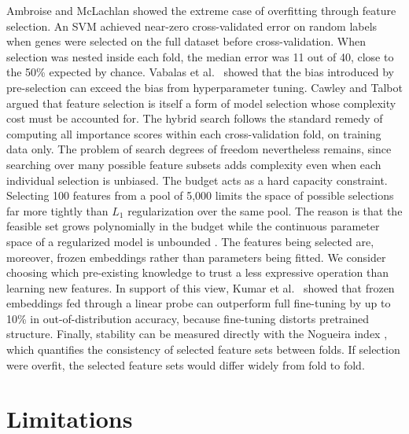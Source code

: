 Ambroise and McLachlan \citep{Ambroise2002} showed the extreme case of overfitting through feature selection. An SVM achieved near-zero cross-validated error on random labels when genes were selected on the full dataset before cross-validation. When selection was nested inside each fold, the median error was 11 out of 40, close to the 50\% expected by chance. Vabalas et al.\ \citep{Vabalas2019} showed that the bias introduced by pre-selection can exceed the bias from hyperparameter tuning. Cawley and Talbot \citep{Cawley2010} argued that feature selection is itself a form of model selection whose complexity cost must be accounted for. The hybrid search follows the standard remedy of computing all importance scores within each cross-validation fold, on training data only. The problem of search degrees of freedom \citep{Tibshirani2015} nevertheless remains, since searching over many possible feature subsets adds complexity even when each individual selection is unbiased. The budget acts as a hard capacity constraint. Selecting 100 features from a pool of 5,000 limits the space of possible selections far more tightly than $L_1$ regularization over the same pool. The reason is that the feasible set grows polynomially in the budget while the continuous parameter space of a regularized model is unbounded \citep{Ng2004}. The features being selected are, moreover, frozen embeddings rather than parameters being fitted. We consider choosing which pre-existing knowledge to trust a less expressive operation than learning new features. In support of this view, Kumar et al.\ \citep{Kumar2022} showed that frozen embeddings fed through a linear probe can outperform full fine-tuning by up to 10\% in out-of-distribution accuracy, because fine-tuning distorts pretrained structure. Finally, stability can be measured directly with the Nogueira index \citep{Nogueira2018}, which quantifies the consistency of selected feature sets between folds. If selection were overfit, the selected feature sets would differ widely from fold to fold.

\section{Limitations}

